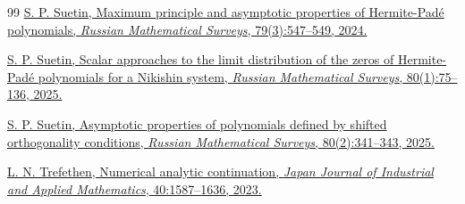 \documentclass[11pt, a4paper, twoside]{article}
\theoremstyle{plain}
\theoremstyle{definition}
\begin{document}
\begin{thebibliography}{99}
 \href{https://www.mathnet.ru/eng/umn10176}{S. P. Suetin, Maximum principle and asymptotic properties of Hermite-Padé polynomials, \textit{Russian Mathematical Surveys}, 79(3):547--549, 2024.}

 \href{https://www.mathnet.ru/eng/umn10194}{S. P. Suetin, Scalar approaches to the limit distribution of the zeros of Hermite-Padé polynomials for a Nikishin system, \textit{Russian Mathematical Surveys}, 80(1):75--136, 2025.}

 \href{https://www.mathnet.ru/eng/umn10240}{S. P. Suetin, Asymptotic properties of polynomials defined by shifted orthogonality conditions, \textit{Russian Mathematical Surveys}, 80(2):341--343, 2025.}

 \href{https://doi.org/10.1007/s13160-023-00599-2}{L. N. Trefethen, Numerical analytic continuation, \textit{Japan Journal of Industrial and Applied Mathematics}, 40:1587--1636, 2023.}

\end{thebibliography}
\end{document}
